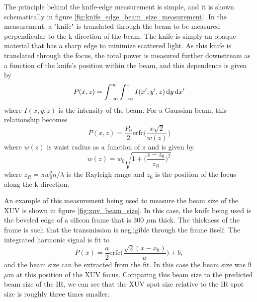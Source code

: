 The principle behind the knife-edge measurement is simple, and it is shown schematically in figure \ref{fig:knife_edge_beam_size_measurement}.  In the measurement, a "knife" is translated through the beam to be measured perpendicular to the k-direction of the beam.  The knife is simply an opaque material that has a sharp edge to minimize scattered light.  As this knife is translated through the focus, the total power is measured further downstream as a function of the knife's position within the beam, and this dependence is given by
\begin{equation}
	\label{eqn:knife_edge_power}
	P(x,z) = \int_{-\infty}^{\infty}\int_{-\infty}^{x}I(x', y',z)\mathop{}\!\mathrm{d} y\mathop{}\!\mathrm{d} x'
\end{equation} 
where $I(x,y,z)$ is the intensity of the beam.  For a Gaussian beam, this relationship becomes
\begin{equation}
	\label{eqn:knife_edge_power_guassian}
	P(x,z) = \frac{P_0}{2}\mathrm{erfc}\bigg(\frac{x\sqrt{2}}{w(z)}\bigg)
\end{equation}
where $w(z)$ is waist radius as a function of $z$ and is given by
\begin{equation}
	\label{eqn:gaussian_waist_radius}
	w(z)=w_0\sqrt{1+\bigg(\frac{z - z_0}{z_R}\bigg)^2}
\end{equation}
where $z_R=\pi w_0^2 n/\lambda$ is the Rayleigh range and $z_0$ is the position of the focus along the k-direction. 

An example of this measurement being used to measure the beam size of the XUV is shown in figure \ref{fig:xuv_beam_size}.  In this case, the knife being used is the beveled edge of a silicon frame that is 300 $\mu$m thick. The thickness of the frame is such that the transmission is negligible through the frame itself.  The integrated harmonic signal is fit to
\begin{equation}
	P(x) = \frac{a}{2}\mathrm{erfc}\bigg(\frac{\sqrt{2}(x-x_0)}{w}\bigg) + b,
\end{equation}
and the beam size can be extracted from the fit.  In this case the beam size was 9 $\mu$m at this position of the XUV focus.  Comparing this beam size to the predicted beam size of the IR, we can see that the XUV spot size relative to the IR spot size is roughly three times smaller.

